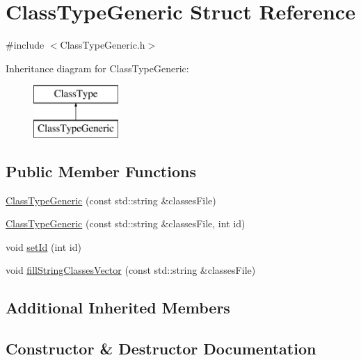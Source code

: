 \hypertarget{struct_class_type_generic}{}\section{Class\+Type\+Generic Struct Reference}
\label{struct_class_type_generic}


{\ttfamily \#include $<$Class\+Type\+Generic.\+h$>$}

Inheritance diagram for Class\+Type\+Generic\+:\begin{figure}[H]
\begin{center}
\leavevmode
\includegraphics[height=2.000000cm]{struct_class_type_generic}
\end{center}
\end{figure}
\subsection*{Public Member Functions}
\begin{DoxyCompactItemize}
\item 
\hyperlink{struct_class_type_generic_a6f6c4bdaff0c95b705261e7d98db6c10}{Class\+Type\+Generic} (const std\+::string \&classes\+File)
\item 
\hyperlink{struct_class_type_generic_adee43b8b4a2c707e92aabb8483541c2e}{Class\+Type\+Generic} (const std\+::string \&classes\+File, int id)
\item 
void \hyperlink{struct_class_type_generic_abb29534e4b1c9e2b33c57df5e56ef2fb}{set\+Id} (int id)
\item 
void \hyperlink{struct_class_type_generic_aff4300aa3e2616422062c5ad88f3209a}{fill\+String\+Classes\+Vector} (const std\+::string \&classes\+File)
\end{DoxyCompactItemize}
\subsection*{Additional Inherited Members}


\subsection{Constructor \& Destructor Documentation}
\mbox{\label{struct_class_type_generic_a6f6c4bdaff0c95b705261e7d98db6c10}} 
